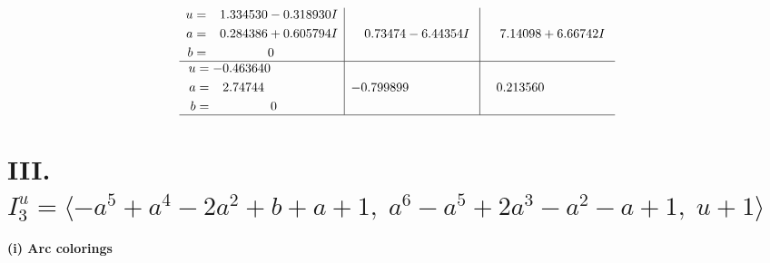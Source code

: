 \documentclass[1p]{elsarticle_modified}
\theoremstyle{definition}
\begin{document}
$$\begin{array}{c|c|c}
\begin{aligned}
u &= \phantom{-}1.334530 - 0.318930 I \\
a &= \phantom{-}0.284386 + 0.605794 I \\
b &= \phantom{-0.000000 } 0\end{aligned}
 & \phantom{-}0.73474 - 6.44354 I & \phantom{-}7.14098 + 6.66742 I \\ \hline\begin{aligned}
u &= -0.463640\phantom{ +0.000000I} \\
a &= \phantom{-}2.74744\phantom{ +0.000000I} \\
b &= \phantom{-0.000000 } 0\end{aligned}
 & -0.799899\phantom{ +0.000000I} & \phantom{-}0.213560\phantom{ +0.000000I}\\
 \hline 
 \end{array}$$\newpage\newpage\renewcommand{\arraystretch}{1}
\centering \section*{III. $I^u_{3}= \langle - a^5+a^4-2 a^2+b+a+1,\;a^6- a^5+2 a^3- a^2- a+1,\;u+1 \rangle$}
\flushleft \textbf{(i) Arc colorings}\\
\end{document}

